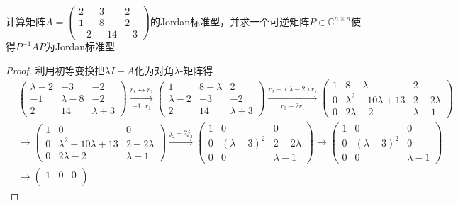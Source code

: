 \documentclass[../../main.tex]{subfiles}%
\begin{document}
\begin{example}
计算矩阵$A=\begin{pmatrix}2 & 3 & 2 \\ 1 & 8 & 2 \\ -2 & -14 & -3\end{pmatrix}$的Jordan标准型，并求一个可逆矩阵$P\in\mathbb{C}^{n\times n}$使得$P^{-1}AP$为Jordan标准型. 
\end{example}
\begin{proof}

利用初等变换把$\lambda I - A$化为对角$\lambda$-矩阵得
\begin{align*}
&\begin{pmatrix}
\lambda - 2 & -3 & -2 \\
-1 & \lambda - 8 & -2 \\
2 & 14 & \lambda + 3
\end{pmatrix}
\xrightarrow[-1 \cdot r_1]{r_1 \longleftrightarrow r_2}
\begin{pmatrix}
1 & 8 - \lambda & 2 \\
\lambda - 2 & -3 & -2 \\
2 & 14 & \lambda + 3
\end{pmatrix}
\xrightarrow[r_3 - 2r_1]{r_2 - (\lambda - 2)r_1}
\begin{pmatrix}
1 & 8 - \lambda & 2 \\
0 & \lambda^2 - 10\lambda + 13 & 2 - 2\lambda \\
0 & 2\lambda - 2 & \lambda - 1
\end{pmatrix} \\
&\longrightarrow
\begin{pmatrix}
1 & 0 & 0 \\
0 & \lambda^2 - 10\lambda + 13 & 2 - 2\lambda \\
0 & 2\lambda - 2 & \lambda - 1
\end{pmatrix}
\xrightarrow[]{j_2 - 2j_3}
\begin{pmatrix}
1 & 0 & 0 \\
0 & (\lambda - 3)^2 & 2 - 2\lambda \\
0 & 0 & \lambda - 1
\end{pmatrix}
\longrightarrow
\begin{pmatrix}
1 & 0 & 0 \\
0 & (\lambda - 3)^2 & 0 \\
0 & 0 & \lambda - 1
\end{pmatrix} \\
&\longrightarrow
\begin{pmatrix}
1 & 0 & 0 \\

\end{pmatrix}
\end{align*}
\end{proof}
\end{document}
